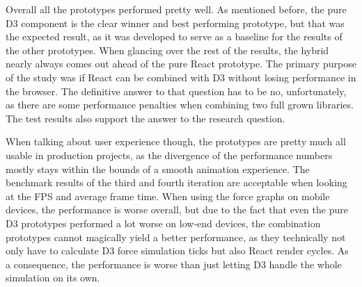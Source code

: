 Overall all the prototypes performed pretty well. As mentioned before, the pure D3 component is the clear winner and best performing prototype, but that was the expected result, as it was developed to serve as a baseline for the results of the other prototypes. When glancing over the rest of the results, the hybrid nearly always comes out ahead of the pure React prototype. The primary purpose of the study was if React can be combined with D3 without losing performance in the browser. The definitive answer to that question has to be no, unfortunately, as there are some performance penalties when combining two full grown libraries. The test results also support the answer to the research question.

When talking about user experience though, the prototypes are pretty much all usable in production projects, as the divergence of the performance numbers mostly stays within the bounds of a smooth animation experience. The benchmark results of the third and fourth iteration are acceptable when looking at the FPS and average frame time. When using the force graphs on mobile devices, the performance is worse overall, but due to the fact that even the pure D3 prototypes performed a lot worse on low-end devices, the combination prototypes cannot magically yield a better performance, as they technically not only have to calculate D3 force simulation ticks but also React render cycles. As a consequence, the performance is worse than just letting D3 handle the whole simulation on its own. 

